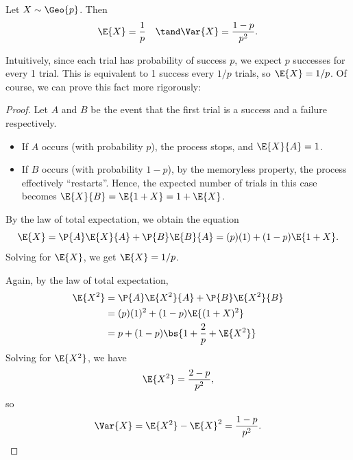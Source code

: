 \begin{proposition}
    Let $X \sim \Geo{p}$. Then \[\E{X} = \frac1p \quad \tand \Var{X} = \frac{1-p}{p^2}.\]
\end{proposition}
Intuitively, since each trial has probability of success $p$, we expect $p$ successes for every 1 trial. This is equivalent to 1 success every $1/p$ trials, so $\E{X} = 1/p$. Of course, we can prove this fact more rigorously:
\begin{proof}
    Let $A$ and $B$ be the event that the first trial is a success and a failure respectively.
    \begin{itemize}
        \item If $A$ occurs (with probability $p$), the process stops, and $\E{X}{A} = 1$.
        \item If $B$ occurs (with probability $1-p$), by the memoryless property, the process effectively ``restarts''. Hence, the expected number of trials in this case becomes $\E{X}{B} = \E{1 + X} = 1 + \E{X}$.
    \end{itemize}

    By the law of total expectation, we obtain the equation \[\E{X} = \P{A} \E{X}{A} + \P{B} \E{B}{A} = (p)(1) + (1-p)\E{1 + X}.\] Solving for $\E{X}$, we get $\E{X} = 1/p$.

    Again, by the law of total expectation,
    \begin{align*}
        \E{X^2} &= \P{A} \E{X^2}{A} + \P{B} \E{X^2}{B}\\
        &= (p)(1)^2 + (1-p)\E{(1 + X)^2}\\
        &= p + (1-p)\bs{1 + \frac2p + \E{X^2}}
    \end{align*}
    Solving for $\E{X^2}$, we have \[\E{X^2} = \frac{2-p}{p^2},\] so \[\Var{X} = \E{X^2} - \E{X}^2 = \frac{1-p}{p^2}.\]
\end{proof}

